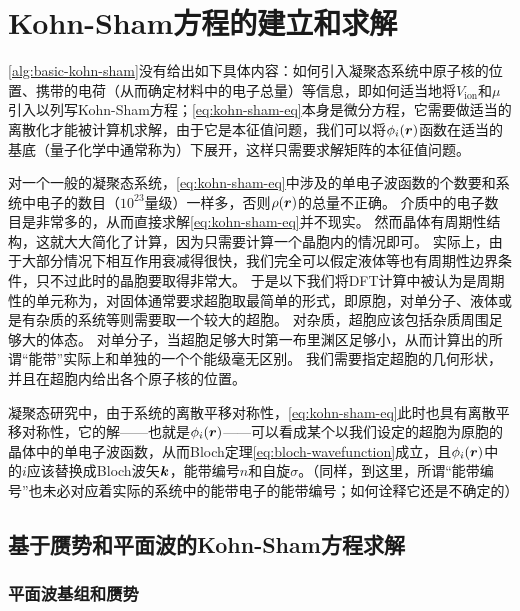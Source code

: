 \section{Kohn-Sham方程的建立和求解}

\autoref{alg:basic-kohn-sham}没有给出如下具体内容：如何引入凝聚态系统中原子核的位置、携带的电荷（从而确定材料中的电子总量）等信息，即如何适当地将$V_\text{ion}$和$\mu$引入以列写Kohn-Sham方程；\eqref{eq:kohn-sham-eq}本身是微分方程，它需要做适当的离散化才能被计算机求解，由于它是本征值问题，我们可以将$\phi_i(\vb*{r})$函数在适当的基底（量子化学中通常称为）下展开，这样只需要求解矩阵的本征值问题。

对一个一般的凝聚态系统，\eqref{eq:kohn-sham-eq}中涉及的单电子波函数的个数要和系统中电子的数目（$10^{23}$量级）一样多，否则$\rho(\vb*{r})$的总量不正确。
介质中的电子数目是非常多的，从而直接求解\eqref{eq:kohn-sham-eq}并不现实。
然而晶体有周期性结构，这就大大简化了计算，因为只需要计算一个晶胞内的情况即可。
实际上，由于大部分情况下相互作用衰减得很快，我们完全可以假定液体等也有周期性边界条件，只不过此时的晶胞要取得非常大。
于是以下我们将DFT计算中被认为是周期性的单元称为，对固体通常要求超胞取最简单的形式，即原胞，对单分子、液体或是有杂质的系统等则需要取一个较大的超胞。
对杂质，超胞应该包括杂质周围足够大的体态。
对单分子，当超胞足够大时第一布里渊区足够小，从而计算出的所谓“能带”实际上和单独的一个个能级毫无区别。
我们需要指定超胞的几何形状，并且在超胞内给出各个原子核的位置。

凝聚态研究中，由于系统的离散平移对称性，\eqref{eq:kohn-sham-eq}此时也具有离散平移对称性，它的解——也就是$\phi_i(\vb*{r})$——可以看成某个以我们设定的超胞为原胞的晶体中的单电子波函数，从而Bloch定理\eqref{eq:bloch-wavefunction}成立，且$\phi_i(\vb*{r})$中的$i$应该替换成Bloch波矢$\vb*{k}$，能带编号$n$和自旋$\sigma$。（同样，到这里，所谓“能带编号”也未必对应着实际的系统中的能带电子的能带编号；如何诠释它还是不确定的）

\subsection{基于赝势和平面波的Kohn-Sham方程求解}\label{sec:supercell-pwdft}

\subsubsection{平面波基组和赝势}

